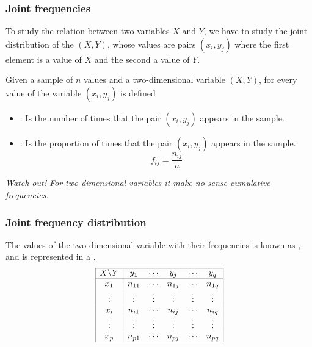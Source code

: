 \begin{frame}
\frametitle{Joint frequencies}
To study the relation between two variables $X$ and $Y$, we have to study the joint distribution of the
 $(X,Y)$, whose values are pairs $(x_i,y_j)$ where the first element is a value of
$X$ and the second a value of $Y$.

\begin{definition}
Given a sample of $n$ values and a two-dimensional variable $(X,Y)$, for every value of the variable $(x_i,y_j)$
is defined
\begin{itemize}
\item {}: Is the number of times that the pair $(x_i,y_j)$ appears in the sample.
\item {}: Is the proportion of times that the pair $(x_i,y_j)$ appears in the
sample.
\[
f_{ij}=\frac{n_{ij}}{n}
\]
\end{itemize}
\end{definition}

\begin{center}
\alert{\emph{Watch out! For two-dimensional variables it make no sense cumulative frequencies.}}
\end{center}
\end{frame}


\begin{frame}
\frametitle{Joint frequency distribution}
The values of the two-dimensional variable with their frequencies is known as ,
and is represented in a .
\[
\begin{array}{|c|ccccc|}
\hline
X\backslash Y & y_1 & \cdots & y_j & \cdots & y_q\\
\hline
x_1 & n_{11} & \cdots & n_{1j} & \cdots & n_{1q}\\
\vdots & \vdots & \vdots & \vdots & \vdots & \vdots\\
x_i & n_{i1} & \cdots & n_{ij} & \cdots & n_{iq}\\
\vdots & \vdots & \vdots & \vdots & \vdots & \vdots\\
x_p & n_{p1} & \cdots & n_{pj} & \cdots & n_{pq}\\
\hline
\end{array}
\]
\end{frame}


